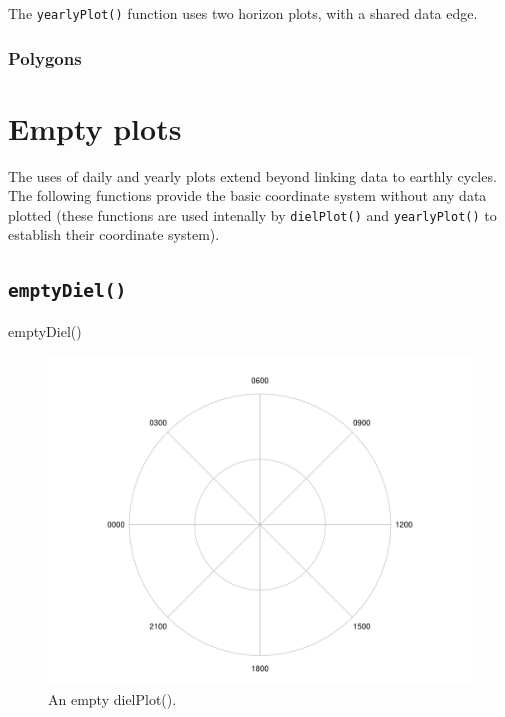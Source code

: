 \documentclass[
]{book}
\newenvironment{Shaded}{\begin{snugshade}}{\end{snugshade}}
\newcommand{\FunctionTok}[1]{\textcolor[rgb]{0.00,0.00,0.00}{#1}}
\newcommand{\NormalTok}[1]{#1}
\begin{document}
The \texttt{yearlyPlot()} function uses two horizon plots, with a shared data edge.

\hypertarget{polygons}{%
\subsubsection{Polygons}\label{polygons}}

\hypertarget{empty-plots}{%
\section{Empty plots}\label{empty-plots}}

The uses of daily and yearly plots extend beyond linking data to earthly cycles. The following functions provide the basic coordinate system without any data plotted (these functions are used intenally by \texttt{dielPlot()} and \texttt{yearlyPlot()} to establish their coordinate system).

\hypertarget{emptydiel}{%
\subsection{\texorpdfstring{\texttt{emptyDiel()}}{emptyDiel()}}\label{emptydiel}}

\begin{Shaded}
\begin{Highlighting}[]
\FunctionTok{emptyDiel}\NormalTok{()}
\end{Highlighting}
\end{Shaded}

\begin{figure}

{\centering \includegraphics[width=0.9\linewidth]{_main_files/figure-latex/emptyDiel-1} 

}

\caption{An empty dielPlot().}\label{fig:emptyDiel}
\end{figure}
\end{document}

